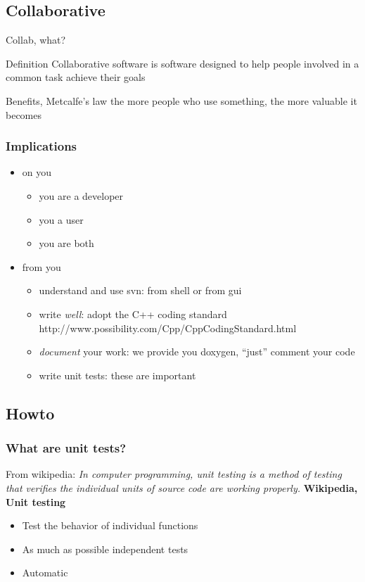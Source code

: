 \documentclass[pdf]{beamer}
\begin{document}
\subsection{Collaborative}
\begin{frame}{Collab, what?}
  \begin{block}{Definition} 
    Collaborative software is software designed to help people involved in a common task achieve their goals
  \end{block}
  \begin{block}{Benefits, Metcalfe's law}
    the more people who use something, the more valuable it becomes
  \end{block}
\end{frame}
\begin{frame}
\frametitle{Implications}
\begin{itemize}
  \item<1-> on you
\begin{itemize}
  \item<2->\alert<3->{you are a developer}
  \item<4->\alert<5->{you a user}
  \item<5-> you are both
\end{itemize}
\item<6-> from you
  \begin{itemize}
  \item<7-> understand and use svn: from shell or from gui
  \item<8-> write \emph{well}: adopt the C++ coding standard http://www.possibility.com/Cpp/CppCodingStandard.html
  \item<8-> \emph{document} your work: we provide you doxygen, ``just'' comment your code
  \item<9-> write unit tests: these are important
\end{itemize}
\end{itemize}
\end{frame}

\subsection{Howto}
\begin{frame}
  \frametitle{What are unit tests?}
  From wikipedia: \textit{In computer programming, unit testing is a method of
testing that verifies the individual units of source code are working properly.} \textbf{Wikipedia, Unit testing}

  \begin{itemize}
    \item<1-> Test the behavior of individual functions
    \item<2-> As much as possible independent tests
    \item<3-> Automatic
  \end{itemize}

\end{frame}
\end{document}
